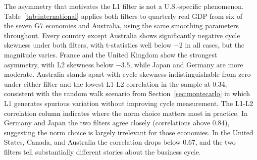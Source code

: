 \documentclass[10pt]{article}
\begin{document}
The asymmetry that motivates the L1 filter is not a U.S.-specific phenomenon. Table~\ref{tab:international} applies both filters to quarterly real GDP from six of the seven G7 economies and Australia, using the same smoothing parameters throughout. Every country except Australia shows significantly negative cycle skewness under both filters, with t-statistics well below $-2$ in all cases, but the magnitude varies. France and the United Kingdom show the strongest asymmetry, with L2 skewness below $-3.5$, while Japan and Germany are more moderate. Australia stands apart with cycle skewness indistinguishable from zero under either filter and the lowest L1-L2 correlation in the sample at 0.34, consistent with the random walk scenario from Section~\ref{sec:montecarlo} in which L1 generates spurious variation without improving cycle measurement. The L1-L2 correlation column indicates where the norm choice matters most in practice. In Germany and Japan the two filters agree closely (correlations above 0.84), suggesting the norm choice is largely irrelevant for those economies. In the United States, Canada, and Australia the correlation drops below 0.67, and the two filters tell substantially different stories about the business cycle.
\end{document}
